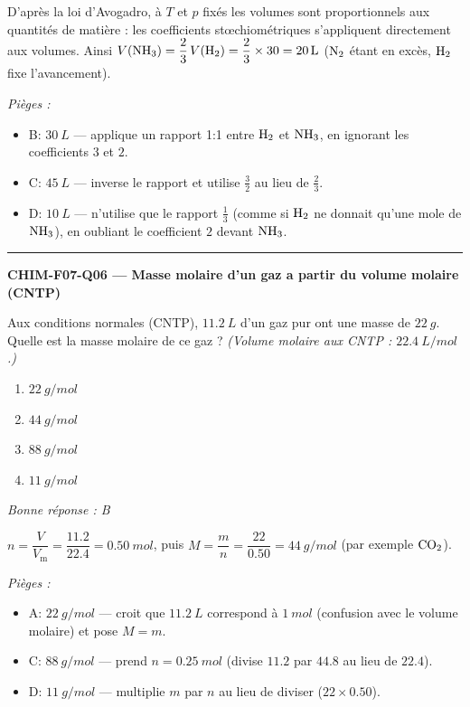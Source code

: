 \documentclass[11pt,a4paper]{article}
\begin{document}
D'après la loi d'Avogadro, à $T$ et $p$ fixés les volumes sont proportionnels aux quantités de matière : les coefficients stœchiométriques s'appliquent directement aux volumes. Ainsi $V(\ce{NH3})=\dfrac{2}{3}\,V(\ce{H2})=\dfrac{2}{3}\times30=\qty{20}{L}$ ($\ce{N2}$ étant en excès, $\ce{H2}$ fixe l'avancement).\par
\textit{Pièges :}
\begin{itemize}
\item B: $\qty{30}{L}$ --- applique un rapport 1:1 entre $\ce{H2}$ et $\ce{NH3}$, en ignorant les coefficients $3$ et $2$.
\item C: $\qty{45}{L}$ --- inverse le rapport et utilise $\tfrac{3}{2}$ au lieu de $\tfrac{2}{3}$.
\item D: $\qty{10}{L}$ --- n'utilise que le rapport $\tfrac{1}{3}$ (comme si $\ce{H2}$ ne donnait qu'une mole de $\ce{NH3}$), en oubliant le coefficient $2$ devant $\ce{NH3}$.
\end{itemize}
\vspace{8pt}\hrule\vspace{8pt}
\noindent\textbf{CHIM-F07-Q06 --- Masse molaire d'un gaz a partir du volume molaire (CNTP)}\par
Aux conditions normales (CNTP), $\qty{11.2}{L}$ d'un gaz pur ont une masse de $\qty{22}{g}$. Quelle est la masse molaire de ce gaz ? \textit{(Volume molaire aux CNTP : $\qty{22.4}{L/mol}$.)}
\begin{enumerate}[label=\Alph*)]
\item $\qty{22}{g/mol}$
\item $\qty{44}{g/mol}$
\item $\qty{88}{g/mol}$
\item $\qty{11}{g/mol}$
\end{enumerate}
\textit{Bonne réponse : B}\par
$n=\dfrac{V}{V_{\mathrm{m}}}=\dfrac{\num{11.2}}{\num{22.4}}=\qty{0.50}{mol}$, puis $M=\dfrac{m}{n}=\dfrac{22}{\num{0.50}}=\qty{44}{g/mol}$ (par exemple $\ce{CO2}$).\par
\textit{Pièges :}
\begin{itemize}
\item A: $\qty{22}{g/mol}$ --- croit que $\qty{11.2}{L}$ correspond à $\qty{1}{mol}$ (confusion avec le volume molaire) et pose $M=m$.
\item C: $\qty{88}{g/mol}$ --- prend $n=\qty{0.25}{mol}$ (divise $\num{11.2}$ par $\num{44.8}$ au lieu de $\num{22.4}$).
\item D: $\qty{11}{g/mol}$ --- multiplie $m$ par $n$ au lieu de diviser ($22\times\num{0.50}$).
\end{itemize}
\end{document}
